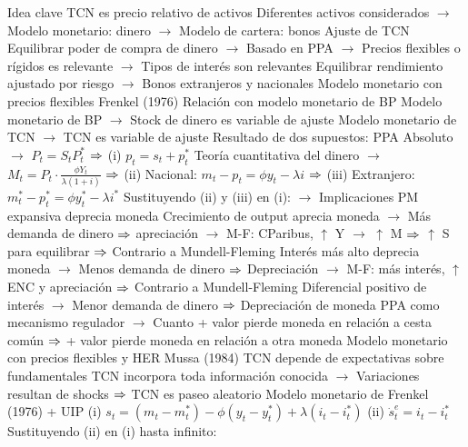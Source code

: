 \documentclass{nuevotema}
\begin{document}
\begin{esquemal}
			\3 Idea clave
				\4 TCN es precio relativo de activos
				\4[] Diferentes activos considerados
				\4[] $\to$ Modelo monetario: dinero
				\4[] $\to$ Modelo de cartera: bonos
				\4 Ajuste de TCN
				\4[] Equilibrar poder de compra de dinero
				\4[] $\to$ Basado en PPA
				\4[] $\to$ Precios flexibles o rígidos es relevante
				\4[] $\to$ Tipos de interés son relevantes
				\4[] Equilibrar rendimiento ajustado por riesgo
				\4[] $\to$ Bonos extranjeros y nacionales
			\3 Modelo monetario con precios flexibles
				\4 Frenkel (1976)
				\4 Relación con modelo monetario de BP
				\4[] Modelo monetario de BP
				\4[] $\to$ Stock de dinero es variable de ajuste
				\4[] Modelo monetario de TCN
				\4[] $\to$ TCN es variable de ajuste
				\4 Resultado de dos supuestos:
				\4[] PPA Absoluto
				\4[] $\to$ $P_t = S_t P^*_t$
				\4[] $\Rightarrow$ (i) $p_t = s_t + p_t^*$
				\4[] Teoría cuantitativa del dinero
				\4[] $\to$ $M_t = P_t \cdot \frac{\phi Y_t}{\lambda (1+ i)}$
				\4[] $\Rightarrow$ (ii) Nacional: $m_t - p_t = \phi y_t - \lambda i $
				\4[] $\Rightarrow$ (iii) Extranjero: $m_t^* - p_t^* = \phi y_t^* - \lambda i^*$
				\4[] Sustituyendo (ii) y (iii) en (i):
				\4[] $\to$ 
				\4 Implicaciones
				\4[] PM expansiva deprecia moneda
				\4[] Crecimiento de output aprecia moneda
				\4[] $\to$ Más demanda de dinero $\Rightarrow$ apreciación
				\4[] $\to$ M-F: CParibus, $\uparrow$ Y $\to$ $\uparrow$ M $\Rightarrow$ $\uparrow$ S para equilibrar
				\4[] $\Rightarrow$ Contrario a Mundell-Fleming
				\4[] Interés más alto deprecia moneda
				\4[] $\to$ Menos demanda de dinero $\Rightarrow$ Depreciación
				\4[] $\to$ M-F: más interés, $\uparrow$ ENC y apreciación
				\4[]  $\Rightarrow$ Contrario a Mundell-Fleming
				\4[] Diferencial positivo de interés
				\4[] $\to$ Menor demanda de dinero
				\4[] $\Rightarrow$ Depreciación de moneda
				\4[] PPA como mecanismo regulador
				\4[] $\to$ Cuanto + valor pierde moneda en relación a cesta común
				\4[] $\Rightarrow$ + valor pierde moneda en relación a otra moneda
			\3 Modelo monetario con precios flexibles y HER
				\4 Mussa (1984)
				\4 TCN depende de expectativas sobre fundamentales
				\4[] TCN incorpora toda información conocida
				\4[] $\to$ Variaciones resultan de shocks
				\4[] $\Rightarrow$ TCN es paseo aleatorio
				\4 Modelo monetario de Frenkel (1976) + UIP
				\4[] (i) $s_t = (m_t - m_t^*) - \phi (y_t - y_t^*) + \lambda (i_t - i_t^*)$
				\4[] (ii) $\dot{s}_t^e = i_t - i_t^*$
				\4[] Sustituyendo (ii) en (i) hasta infinito:
				\4[] 

\end{esquemal}
\end{document}
